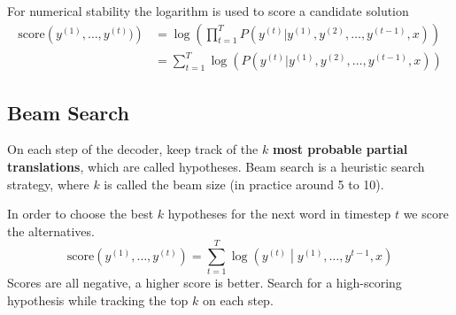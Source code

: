 \documentclass[11pt]{article}
\begin{document}
For numerical stability the logarithm is used to score a candidate solution
\begin{align*}
	\text{score}\left(y^{(1)},\dots,y^{(t)})\right) &= \log\left( \prod_{t=1}^{T} P(y^{(t)}|y^{(1)},y^{(2)},\dots,y^{(t-1)},x) \right)\\
	&= \sum_{t=1}^{T} \log\left(P(y^{(t)}|y^{(1)},y^{(2)},\dots,y^{(t-1)},x)\right)
\end{align*}

\clearpage

\subsection{Beam Search}
On each step of the decoder, keep track of the $k$ \textbf{most probable partial translations}, which are called hypotheses. Beam search is a heuristic search strategy, where $k$ is called the beam size (in practice around 5 to 10).

In order to choose the best $k$ hypotheses for the next word in timestep $t$ we score the alternatives.
\begin{equation*}
	\text{score}\left(y^{(1)},\dots,y^{(t)}\right) = \sum_{t=1}^{T} \log\left( y^{(t)} \middle| y^{(1)},\dots,y^{t-1}, x \right)
\end{equation*}
Scores are all negative, a higher score is better. Search for a high-scoring hypothesis while tracking the top $k$ on each step.
\end{document}

